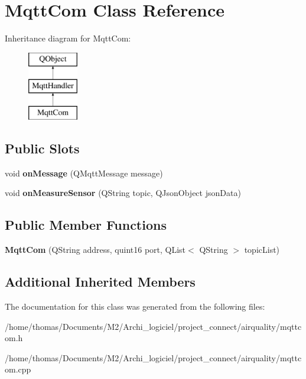 \hypertarget{classMqttCom}{}\section{Mqtt\+Com Class Reference}
\label{classMqttCom}
Inheritance diagram for Mqtt\+Com\+:\begin{figure}[H]
\begin{center}
\leavevmode
\includegraphics[height=3.000000cm]{classMqttCom}
\end{center}
\end{figure}
\subsection*{Public Slots}
\begin{DoxyCompactItemize}
\item 
\mbox{\label{classMqttCom_aa7c8df5147b9906c3f6d50b65b9f828c}} 
void {\bfseries on\+Message} (Q\+Mqtt\+Message message)
\item 
\mbox{\label{classMqttCom_a2653bb72611cb7499d3e95e3a64556d6}} 
void {\bfseries on\+Measure\+Sensor} (Q\+String topic, Q\+Json\+Object json\+Data)
\end{DoxyCompactItemize}
\subsection*{Public Member Functions}
\begin{DoxyCompactItemize}
\item 
\mbox{\label{classMqttCom_a34917fc19aa7d9dfa67f647ed57e11bc}} 
{\bfseries Mqtt\+Com} (Q\+String address, quint16 port, Q\+List$<$ Q\+String $>$ topic\+List)
\end{DoxyCompactItemize}
\subsection*{Additional Inherited Members}


The documentation for this class was generated from the following files\+:\begin{DoxyCompactItemize}
\item 
/home/thomas/\+Documents/\+M2/\+Archi\+\_\+logiciel/project\+\_\+connect/airquality/mqttcom.\+h\item 
/home/thomas/\+Documents/\+M2/\+Archi\+\_\+logiciel/project\+\_\+connect/airquality/mqttcom.\+cpp\end{DoxyCompactItemize}
